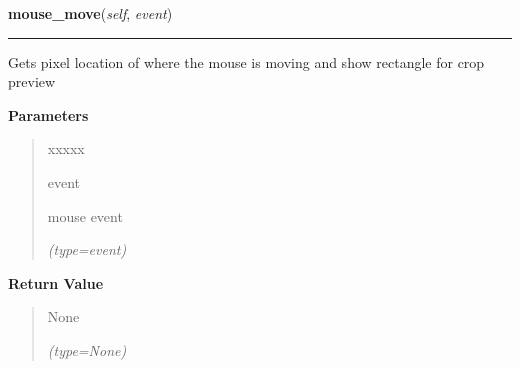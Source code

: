 \hspace{.8\funcindent}\begin{boxedminipage}{\funcwidth}

    \raggedright \textbf{mouse\_move}(\textit{self}, \textit{event})

    \vspace{-1.5ex}

    \rule{\textwidth}{0.5\fboxrule}
\setlength{\parskip}{2ex}
    Gets pixel location of where the mouse is moving and show rectangle for
    crop preview

\setlength{\parskip}{1ex}
      \textbf{Parameters}
      \vspace{-1ex}

      \begin{quote}
        \begin{Ventry}{xxxxx}

          \item[event]

          mouse event

            {\it (type=event)}

        \end{Ventry}

      \end{quote}

      \textbf{Return Value}
    \vspace{-1ex}

      \begin{quote}
      None

      {\it (type=None)}

      \end{quote}

    \end{boxedminipage}

    \label{client_gui:GuiClass:mouse_release}

    \vspace{0.5ex}


